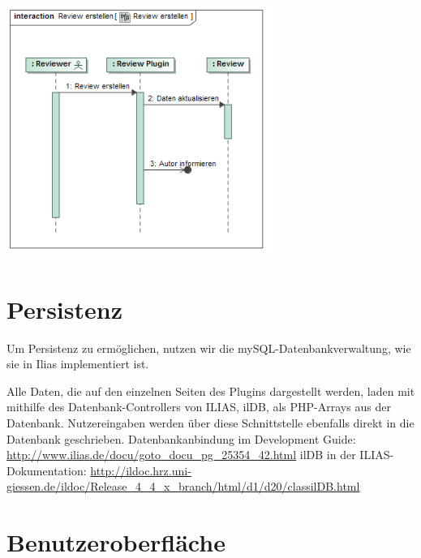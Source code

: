 \documentclass[a4paper]{scrreprt}
\begin{document}
\includegraphics[width=0.65\textwidth]{Sequence_Diagram__Review_erstellen__Review_erstellen.png}
\label{Review beenden}

\section{Persistenz}

Um Persistenz zu ermöglichen, nutzen wir die mySQL-Datenbankverwaltung, wie sie in Ilias implementiert ist. 

Alle Daten, die auf den einzelnen Seiten des Plugins dargestellt werden, laden mit mithilfe des Datenbank-Controllers von ILIAS, ilDB, als PHP-Arrays aus der Datenbank. 
Nutzereingaben werden über diese Schnittstelle ebenfalls direkt in die Datenbank geschrieben.
Datenbankanbindung im Development Guide: \url{http://www.ilias.de/docu/goto_docu_pg_25354_42.html}
ilDB in der ILIAS-Dokumentation: \url{http://ildoc.hrz.uni-giessen.de/ildoc/Release_4_4_x_branch/html/d1/d20/classilDB.html}

\section{Benutzeroberfläche}

\centering
\end{document}

